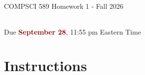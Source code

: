 \documentclass{article}
\begin{document}
\newpage
\vspace*{1cm}
\begin{center}
    \begin{Large}
    COMPSCI 589 Homework 1 - Fall 2026
    \end{Large}
    \\
    \vspace{0.15cm}
    Due \textcolor{darkred}{\textbf{September 28}}, 11:55 pm Eastern Time
\end{center}



\vspace{0.5cm}
\section*{Instructions}
\vspace{0.5cm}
\end{document}
